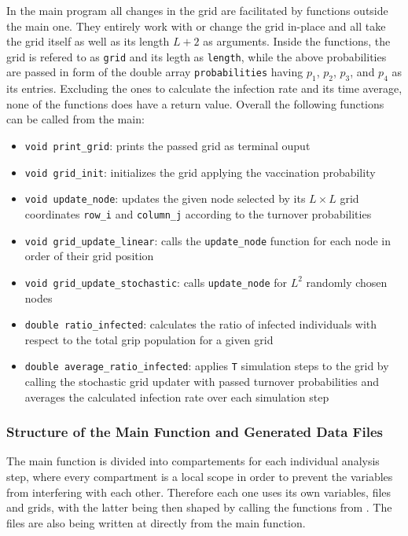 In the main program all changes in the grid are facilitated by functions outside the main one. They entirely work with or change the grid in-place and all take the grid itself as well as its length $L+2$ as arguments.
Inside the functions, the grid is refered to as \texttt{grid} and its legth as \texttt{length}, while the above probabilities are passed in form of the double array \texttt{probabilities} having $p_1$, $p_2$, $p_3$, 
and $p_4$ as its entries. Excluding the ones to calculate the infection rate and its time average, none of the functions does have a return value. Overall the following functions can be called from the main:
\begin{itemize}
    \item \texttt{void print\_grid}: prints the passed grid as terminal ouput
    \item \texttt{void grid\_init}: initializes the grid applying the vaccination probability
    \item \texttt{void update\_node}: updates the given node selected by its $L\times L$ grid coordinates \texttt{row\_i} and \texttt{column\_j} according to the turnover probabilities
    \item \texttt{void grid\_update\_linear}: calls the \texttt{update\_node} function for each node in order of their grid position
    \item \texttt{void grid\_update\_stochastic}: calls \texttt{update\_node} for $L^2$ randomly chosen nodes
    \item \texttt{double ratio\_infected}: calculates the ratio of infected individuals with respect to the total grip population for a given grid
    \item \texttt{double average\_ratio\_infected}: applies \texttt{T} simulation steps to the grid by calling the stochastic grid updater with passed turnover probabilities 
    and averages the calculated infection rate over each simulation step
\end{itemize}


\subsubsection{Structure of the Main Function and Generated Data Files}

The main function is divided into compartements for each individual analysis step, where every compartment is a local scope in order to prevent the variables from interfering with each other.
Therefore each one uses its own variables, files and grids, with the latter being then shaped by calling the functions from . The files are also being written at
directly from the main function.

